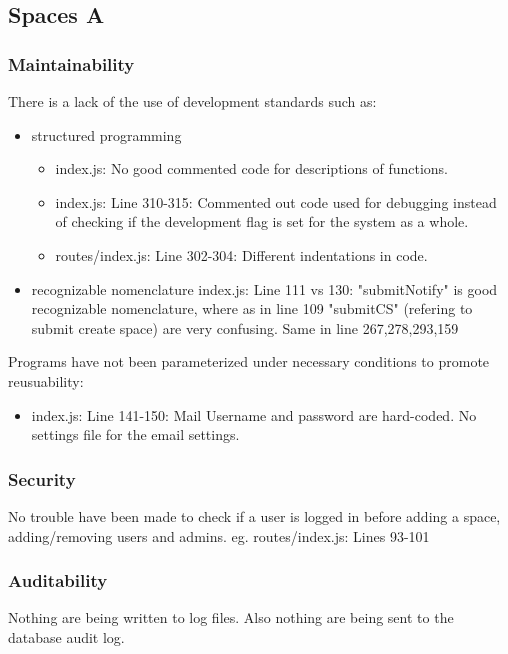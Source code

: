 
\subsection{Spaces A}

\subsubsection{Maintainability}
There is a lack of the use of development standards such as:
\begin{itemize}
	\item structured programming
		\begin{itemize}
			\item index.js: No good commented code for descriptions of functions.
			\item index.js: Line 310-315: Commented out code used for debugging instead of checking if the development flag is set for the system as a whole.
			\item routes/index.js: Line 302-304: Different indentations in code.
		\end{itemize}
	\item recognizable nomenclature
index.js: Line 111 vs 130: "submitNotify" is good recognizable nomenclature, where as in line 109 "submitCS" (refering to submit create space) are very confusing. Same in line 267,278,293,159
\end{itemize}

Programs have not been parameterized under necessary conditions to promote reusuability:
\begin{itemize}
	\item index.js: Line 141-150: Mail Username and password are hard-coded. No settings file for the email settings.
	
\end{itemize}

\subsubsection{Security}

No trouble have been made to check if a user is logged in before adding a space, adding/removing users and admins. eg. routes/index.js: Lines 93-101

\subsubsection{Auditability}

Nothing are being written to log files. Also nothing are being sent to the database audit log.

